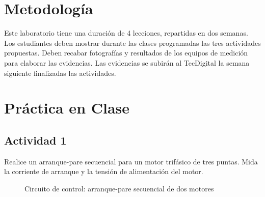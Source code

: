 \section{Metodología}

Este laboratorio tiene una duración de 4 lecciones, repartidas en dos semanas. Los estudiantes deben mostrar durante las clases programadas las tres actividades propuestas. Deben recabar fotografías y resultados de los equipos de medición para elaborar las evidencias. Las evidencias se subirán al TecDigital la semana siguiente finalizadas las actividades.

\section{Práctica en Clase}

\subsection{Actividad 1}

Realice un arranque-pare secuencial para un motor trifásico de tres puntas. Mida la corriente de arranque y la tensión de alimentación del motor.

\begin{figure}[H]
\centering
    \caption{Circuito de control: arranque-pare secuencial de dos motores}
    \label{fig:control-secuencial}
\end{figure}

